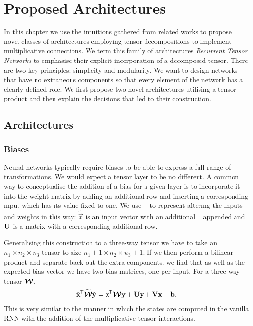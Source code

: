 
\chapter{Proposed Architectures}\label{C:arch}
In this chapter we use the intuitions gathered from related works to propose novel classes of
architectures employing tensor decompositions to implement multiplicative connections. We term this
family of architectures \emph{Recurrent Tensor Networks} to emphasise their explicit incorporation
of a decomposed tensor. There are
two key principles: simplicity and modularity. We want to design networks that have no extraneous
components so that every element of the network has a clearly defined role. We first propose
two novel architectures utilising a tensor product and then explain the decisions that led to their
construction.

\section{Architectures}
\subsection{Biases}
Neural networks typically require biases to be able to express a full range of transformations. We would
expect a tensor layer to be no different. A common way to conceptualise the addition of a bias for a
given layer is to incorporate it into the weight matrix by adding an additional row and inserting a
corresponding input which has its value fixed to one. 
We use \(\tilde{\phantom{x}}\) to represent altering the inputs
and weights in this way: \(\tilde{\vec{x}}\) is an input vector with an additional \(1\) appended
and \(\tilde{\mathbf{U}}\) is a matrix with a corresponding additional row.

Generalising this construction to a three-way tensor we have to take an \(n_1 \times n_2 \times n_3\)
tensor to size \(n_1 + 1 \times n_2 \times n_3 +1\). If we then perform a bilinear product and separate
back out the extra components, we find that as well as the expected bias vector we have
two bias matrices, one per input. For a three-way tensor \(\bm{\mathcal{W}}\),
\begin{equation}\label{eq:tensorbias}
	\tilde{\mathbf{x}}^{\mkern-1.5mu\mathsf{T}}\widetilde{\bm{\mathcal{W}}}\tilde{\mathbf{y}}
	= \mathbf{x}^{\mkern-1.5mu\mathsf{T}}\bm{\mathcal{W}}\mathbf{y} + \mathbf{U}\mathbf{y} + \mathbf{V}\mathbf{x} + \mathbf{b}.
\end{equation} This is very similar to the manner in which the states are computed in the vanilla
RNN with the addition of the multiplicative tensor interactions.

